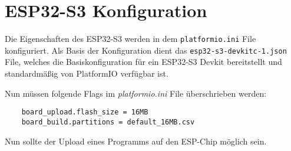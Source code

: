     \section{ESP32-S3 Konfiguration}
    Die Eigenschaften des ESP32-S3 werden in dem \lstinline{platformio.ini}
    File konfiguriert. Als Basis der Konfiguration dient
    das \lstinline{esp32-s3-devkitc-1.json} File, welches die
    Basiskonfiguration für ein ESP32-S3 Devkit bereitstellt
    und standardmäßig von PlatformIO verfügbar ist. \par
    
    Nun müssen folgende Flags im \textit{platformio.ini} File
    überschrieben werden:

    \begin{lstlisting}
    board_upload.flash_size = 16MB
    board_build.partitions = default_16MB.csv
    \end{lstlisting}

    Nun sollte der Upload eines Programms auf den 
    ESP-Chip möglich sein.

    
    




